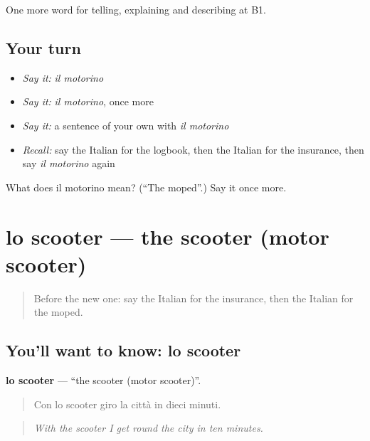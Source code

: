 \begin{grammarlens}[title={What you've built}]
One more word for telling, explaining and describing at B1.
\end{grammarlens}

\subsection*{Your turn}
\begin{itemize}
\raggedright
  \item \emph{Say it:} \emph{il motorino}
  \item \emph{Say it:} \emph{il motorino}, once more
  \item \emph{Say it:} a sentence of your own with \emph{il motorino}
  \item \emph{Recall:} say the Italian for the logbook, then the Italian for the insurance, then say \emph{il motorino} again
\end{itemize}

\begin{tcolorbox}[breakable,colback=teal!4,colframe=teal!35!black,title={Before you move on}]
What does il motorino mean? (\textquotedblleft{}The moped\textquotedblright{}.) Say it once more.
\end{tcolorbox}
\section[lo scooter]{lo scooter — the scooter (motor scooter)}

\label{lesson:IT-C416-scooter}



\begin{quote}
Before the new one: say the Italian for the insurance, then the Italian for the moped.
\end{quote}

\subsection*{You'll want to know: lo scooter}
\textbf{lo scooter} — \textquotedblleft{}the scooter (motor scooter)\textquotedblright{}.

\begin{quote}
Con lo scooter giro la città in dieci minuti.
\end{quote}

\begin{quote}
\emph{With the scooter I get round the city in ten minutes.}
\end{quote}

